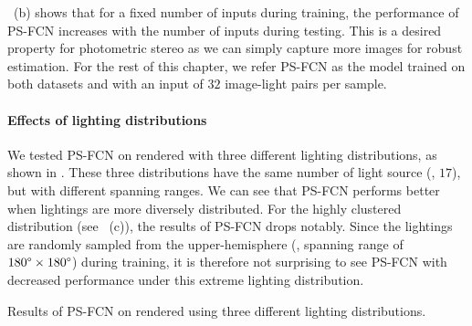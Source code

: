 ~(b) shows that for a fixed number of inputs during training, the performance of PS-FCN increases with the number of inputs during testing. This is a desired property for photometric stereo as we can simply capture more images for robust estimation. 
For the rest of this chapter, we refer PS-FCN as the model trained on both datasets and with an input of $32$ image-light pairs per sample.

\paragraph{Effects of lighting distributions} We tested PS-FCN on  rendered with three different lighting distributions, as shown in . These three distributions have the same number of light source (\ie, $17$), but with different spanning ranges.
We can see that PS-FCN performs better when lightings are more diversely distributed. For the highly clustered distribution (see ~(c)), the results of PS-FCN drops notably. Since the lightings are randomly sampled from the upper-hemisphere (\ie, spanning range of $180\degree \times 180\degree$) during training, it is therefore not surprising to see PS-FCN with decreased performance under this extreme lighting distribution.

\begin{table}[htbp] \centering
    \caption[Results on  rendered using three different lighting distributions]{Results of PS-FCN on  rendered using three different lighting distributions.} 
    \label{tab:res_synth_mirco_baseline}
    
\end{table}

